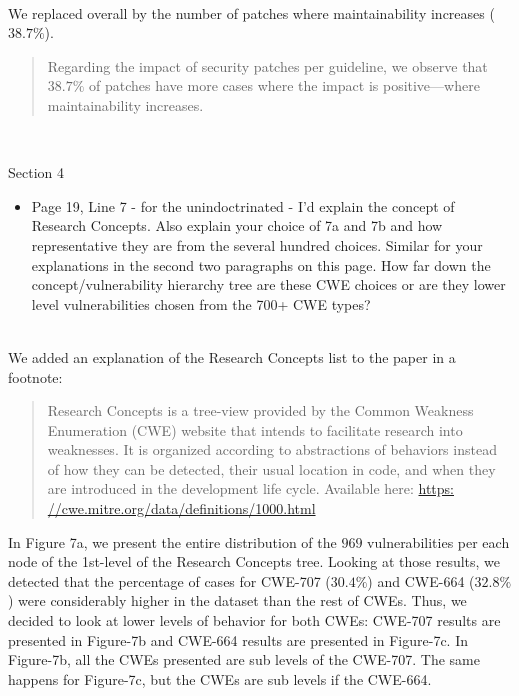 \documentclass[11pt,fleqn]{article}
\newcommand{\eline}{\vspace*{.75\baselineskip}}
\newcommand{\Referee}[1]{\eline \noindent {\bf Reviewer comment #1:} \\}
\newcommand{\Us}{\eline \noindent {\bf Response:}\\}
\newenvironment{revcomment}[1][]
{\Referee{#1}\begin{rcomment}}
{\end{rcomment}}
\begin{document}
\Us We replaced overall by the number of patches where maintainability 
increases ($38.7\%$).

\begin{quote}
    Regarding the impact of security patches per guideline, we 
observe that $38.7\%$ of patches have more cases where the impact is 
positive---where maintainability increases.
\end{quote}

\begin{revcomment}[2.18]
    Section 4\\
    \begin{itemize}
        \item Page 19, Line 7 - for the unindoctrinated - I'd 
        explain the concept of Research Concepts. Also explain 
        your choice of 7a and 7b and how representative they are 
        from the several hundred choices. Similar for your explanations 
        in the second two paragraphs on this page.  How far down the 
        concept/vulnerability hierarchy tree are these CWE choices or 
        are they lower level vulnerabilities chosen from the 700+ CWE types?
    \end{itemize}
\end{revcomment}

\Us We added an explanation of the Research Concepts list to the paper
in a footnote:

\begin{quote}
    Research Concepts is a tree-view provided by the Common Weakness 
    Enumeration (CWE) website that intends to facilitate research into 
    weaknesses. It is organized 
    according to 
    abstractions of behaviors instead of how they can be detected, 
    their usual location in code, and when they are introduced in the 
    development life cycle. Available here: 
    \url{https: //cwe.mitre.org/data/definitions/1000.html}
\end{quote}

In Figure 7a, we present the entire distribution of the $969$ vulnerabilities per
each node of the 1st-level of the Research Concepts tree.
Looking at those results, we detected that the percentage of cases for CWE-707 ($30.4\%$) 
and CWE-664 ($32.8\%$) were considerably higher in the dataset than the rest of CWEs.
Thus, we decided to look at lower levels of behavior for both CWEs: CWE-707
results are presented in Figure-7b and CWE-664 results are presented in Figure-7c.
In Figure-7b, all the CWEs presented are sub levels of the CWE-707. The same
happens for Figure-7c, but the CWEs are sub levels if the CWE-664.
\end{document}

